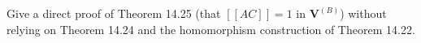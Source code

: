 Give a direct proof of Theorem 14.25 (that $[[AC]] = 1$ in $\mathbf{V}^{(B)}$) without relying on Theorem 14.24 and the homomorphism construction of Theorem 14.22.
